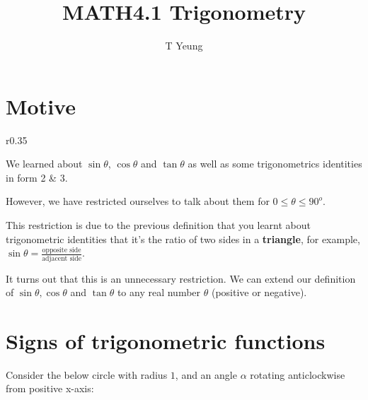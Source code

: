 \documentclass[11pt,letterpaper]{article}
\title{MATH4.1 Trigonometry}
\author{T Yeung}
\begin{document}
\maketitle
\section{Motive}

\begin{wrapfigure}{r}{0.35\textwidth}
\end{wrapfigure}

We learned about $\sin \theta$, $\cos \theta$ and $\tan \theta$ as well as some trigonometrics identities in form 2 \& 3. 

However, we have restricted ourselves to talk about them for $0 \leq \theta \leq 90^o$.

This restriction is due to the previous definition that you learnt about trigonometric identities that it's the ratio of two sides in a \textbf{triangle}, for example, $\sin \theta = \frac{\text{opposite side}}{\text{adjacent side}}$.

It turns out that this is an unnecessary restriction. We can extend our definition of $\sin \theta, \cos \theta$ and $\tan \theta$ to any real number $\theta$ (positive or negative).

\section{Signs of trigonometric functions}

Consider the below circle with radius $1$, and an angle $\alpha$ rotating anticlockwise from positive x-axis:
\end{document}
